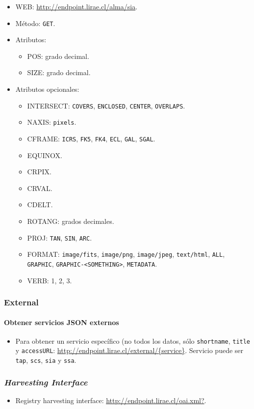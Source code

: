 \begin{itemize}
	\item WEB: \url{http://endpoint.lirae.cl/alma/sia}.
	\item M\'etodo: \verb;GET;.
	\item Atributos: 
		\begin{itemize}
			\item POS: grado decimal.
			\item SIZE: grado decimal.
		\end{itemize}
	\item Atributos opcionales:
		\begin{itemize}
			\item INTERSECT: \verb;COVERS;, \verb;ENCLOSED;, \verb;CENTER;, \verb;OVERLAPS;.
			\item NAXIS: \verb;pixels;.
			\item CFRAME: \verb;ICRS;, \verb;FK5;, \verb;FK4;, \verb;ECL;, \verb;GAL;, \verb;SGAL;.
			\item EQUINOX.
			\item CRPIX.
			\item CRVAL.
			\item CDELT.
			\item ROTANG: grados decimales.
			\item PROJ: \verb;TAN;, \verb;SIN;, \verb;ARC;.
			\item FORMAT: \verb;image/fits;, \verb;image/png;, \verb;image/jpeg;, \verb;text/html;, \verb;ALL;, \verb;GRAPHIC;, \verb;GRAPHIC-<SOMETHING>;, \verb;METADATA;.
			\item VERB: 1, 2, 3.
		\end{itemize}
\end{itemize}

\subsubsection*{{\sc External}} 

\paragraph{Obtener servicios JSON externos}

\begin{itemize}
	\item Para obtener un servicio específico (no todos los datos, sólo \verb;shortname;, \verb;title; y \verb;accessURL;: \url{http://endpoint.lirae.cl/external/{service}}. Servicio puede ser \verb;tap;, \verb;scs;, \verb;sia; y \verb;ssa;.
\end{itemize}

\subsubsection*{\emph{Harvesting Interface}}

\begin{itemize}
	\item Registry harvesting interface: \url{http://endpoint.lirae.cl/oai.xml?}.
\end{itemize}
